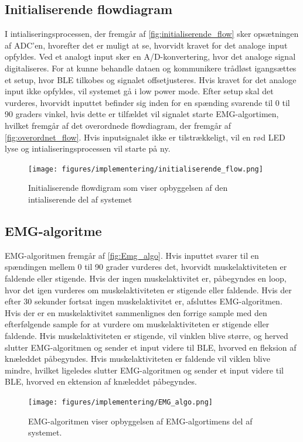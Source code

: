 \subsection{Initialiserende flowdiagram}
I intialiseringsprocessen, der fremgår af \autoref{fig:initialiserende_flow} sker opsætningen af ADC'en, hvorefter det er muligt at se, hvorvidt kravet for det analoge input opfyldes. Ved et analogt input sker en A/D-konvertering, hvor det analoge signal digitaliseres. For at kunne behandle dataen og kommunikere trådløst igangsættes et setup, hvor BLE tilkobes og signalet offsetjusteres. Hvis kravet for det analoge input ikke opfyldes, vil systemet gå i low power mode. Efter setup skal det vurderes, hvorvidt inputtet befinder sig inden for en spænding svarende til 0 til 90 graders vinkel, hvis dette er tilfældet vil signalet starte EMG-algortimen, hvilket fremgår af det overordnede flowdiagram, der fremgår af \autoref{fig:overordnet_flow}. Hvis inputsignalet ikke er tilstrækkeligt, vil en rød LED lyse og intialiseringsprocessen vil starte på ny. 
\begin{figure}[H]
\centering
\texttt{[image: figures/implementering/initialiserende\_flow.png]}
\caption{Initialiserende flowdigram som viser opbyggelsen af den intialiserende del af systemet}
\label{fig:initialiserende_flow}
\end{figure}

\subsection{EMG-algoritme}
EMG-algoritmen fremgår af \autoref{fig:Emg_algo}. Hvis inputtet svarer til en spændingen mellem 0 til 90 grader vurderes det, hvorvidt muskelaktiviteten er faldende eller stigende. Hvis der ingen muskelaktivitet er, påbegyndes en loop, hvor det igen vurderes om muskelaktiviteten er stigende eller faldende. Hvis der efter 30 sekunder fortsat ingen muskelaktivitet er, afsluttes EMG-algoritmen. Hvis der er en muskelaktivitet sammenlignes den forrige sample med den efterfølgende sample for at vurdere om muskelaktiviteten er stigende eller faldende. Hvis muskelaktiviteten er stigende, vil vinklen blive større, og herved slutter EMG-algoritmen og sender et input videre til BLE, hvorved en fleksion af knæleddet påbegyndes. Hvis muskelaktiviteten er faldende vil viklen blive mindre, hvilket ligeledes slutter EMG-algoritmen og sender et input videre til BLE, hvorved en ektension af knæleddet påbegyndes. 
\begin{figure}[H]
\centering
\texttt{[image: figures/implementering/EMG\_algo.png]}
\caption{EMG-algoritmen viser opbyggelsen af EMG-algortimens del af systemet.}
\label{fig:Emg_algo}
\end{figure}

